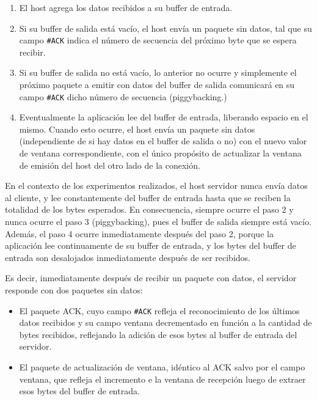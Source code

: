 \documentclass[a4paper, 10pt, twoside]{article}
\newcommand{\ack}{\texttt{\#ACK}\xspace}
\begin{document}
\begin{enumerate}
  \item El host agrega los datos recibidos a su buffer de entrada.
  
  \item Si su buffer de salida está vacío, el host envía un paquete sin datos, tal que su campo \ack indica el número de secuencia del próximo byte que se espera recibir.
  
  \item Si su buffer de salida no está vacío, lo anterior no ocurre y simplemente el próximo paquete a emitir con datos del buffer de salida comunicará en su campo \ack dicho número de secuencia (piggybacking.)
  
  \item Eventualmente la aplicación lee del buffer de entrada, liberando espacio en el mismo. Cuando esto ocurre, el host envía un paquete sin datos (independiente de si hay datos en el buffer de salida o no) con el nuevo valor de ventana correspondiente, con el único propósito de actualizar la ventana de emisión del host del otro lado de la conexión.
\end{enumerate}

En el contexto de los experimentos realizados, el host servidor nunca envía datos al cliente, y lee constantemente del buffer de entrada hasta que se reciben la totalidad de los bytes esperados. En consecuencia, siempre ocurre el paso 2 y nunca ocurre el paso 3 (piggybacking), pues el buffer de salida siempre está vacío. Además, el paso 4 ocurre inmediatamente después del paso 2, porque la aplicación lee continuamente de su buffer de entrada, y los bytes del buffer de entrada son desalojados inmediatamente después de ser recibidos.

Es decir, inmediatamente después de recibir un paquete con datos, el servidor responde con dos paquetes sin datos:

\begin{itemize}
  \item El paquete ACK, cuyo campo \ack refleja el reconocimiento de los últimos datos recibidos y su campo ventana decrementado en función a la cantidad de bytes recibidos, reflejando la adición de esos bytes al buffer de entrada del servidor.

  \item El paquete de actualización de ventana, idéntico al ACK salvo por el campo ventana, que refleja el incremento e la ventana de recepción luego de extraer esos bytes del buffer de entrada.
\end{itemize}
\end{document}
